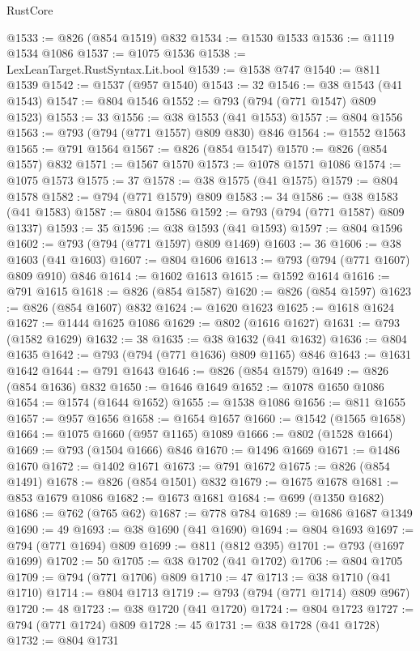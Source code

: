 \begin{lexlean}{RustCore}
\begin{coremodule}
@1533 := @826 (@854 @1519) @832
@1534 := @1530 @1533
@1536 := @1119 @1534 @1086
@1537 := @1075 @1536
@1538 := LexLeanTarget.RustSyntax.Lit.bool
@1539 := @1538 @747
@1540 := @811 @1539
@1542 := @1537 (@957 @1540)
@1543 := 32
@1546 := @38 @1543 (@41 @1543)
@1547 := @804 @1546
@1552 := @793 (@794 (@771 @1547) @809 @1523)
@1553 := 33
@1556 := @38 @1553 (@41 @1553)
@1557 := @804 @1556
@1563 := @793 (@794 (@771 @1557) @809 @830) @846
@1564 := @1552 @1563
@1565 := @791 @1564
@1567 := @826 (@854 @1547)
@1570 := @826 (@854 @1557) @832
@1571 := @1567 @1570
@1573 := @1078 @1571 @1086
@1574 := @1075 @1573
@1575 := 37
@1578 := @38 @1575 (@41 @1575)
@1579 := @804 @1578
@1582 := @794 (@771 @1579) @809
@1583 := 34
@1586 := @38 @1583 (@41 @1583)
@1587 := @804 @1586
@1592 := @793 (@794 (@771 @1587) @809 @1337)
@1593 := 35
@1596 := @38 @1593 (@41 @1593)
@1597 := @804 @1596
@1602 := @793 (@794 (@771 @1597) @809 @1469)
@1603 := 36
@1606 := @38 @1603 (@41 @1603)
@1607 := @804 @1606
@1613 := @793 (@794 (@771 @1607) @809 @910) @846
@1614 := @1602 @1613
@1615 := @1592 @1614
@1616 := @791 @1615
@1618 := @826 (@854 @1587)
@1620 := @826 (@854 @1597)
@1623 := @826 (@854 @1607) @832
@1624 := @1620 @1623
@1625 := @1618 @1624
@1627 := @1444 @1625 @1086
@1629 := @802 (@1616 @1627)
@1631 := @793 (@1582 @1629)
@1632 := 38
@1635 := @38 @1632 (@41 @1632)
@1636 := @804 @1635
@1642 := @793 (@794 (@771 @1636) @809 @1165) @846
@1643 := @1631 @1642
@1644 := @791 @1643
@1646 := @826 (@854 @1579)
@1649 := @826 (@854 @1636) @832
@1650 := @1646 @1649
@1652 := @1078 @1650 @1086
@1654 := @1574 (@1644 @1652)
@1655 := @1538 @1086
@1656 := @811 @1655
@1657 := @957 @1656
@1658 := @1654 @1657
@1660 := @1542 (@1565 @1658)
@1664 := @1075 @1660 (@957 @1165) @1089
@1666 := @802 (@1528 @1664)
@1669 := @793 (@1504 @1666) @846
@1670 := @1496 @1669
@1671 := @1486 @1670
@1672 := @1402 @1671
@1673 := @791 @1672
@1675 := @826 (@854 @1491)
@1678 := @826 (@854 @1501) @832
@1679 := @1675 @1678
@1681 := @853 @1679 @1086
@1682 := @1673 @1681
@1684 := @699 (@1350 @1682)
@1686 := @762 (@765 @62)
@1687 := @778 @784
@1689 := @1686 @1687 @1349
@1690 := 49
@1693 := @38 @1690 (@41 @1690)
@1694 := @804 @1693
@1697 := @794 (@771 @1694) @809
@1699 := @811 (@812 @395)
@1701 := @793 (@1697 @1699)
@1702 := 50
@1705 := @38 @1702 (@41 @1702)
@1706 := @804 @1705
@1709 := @794 (@771 @1706) @809
@1710 := 47
@1713 := @38 @1710 (@41 @1710)
@1714 := @804 @1713
@1719 := @793 (@794 (@771 @1714) @809 @967)
@1720 := 48
@1723 := @38 @1720 (@41 @1720)
@1724 := @804 @1723
@1727 := @794 (@771 @1724) @809
@1728 := 45
@1731 := @38 @1728 (@41 @1728)
@1732 := @804 @1731

\end{coremodule}
\end{lexlean}
